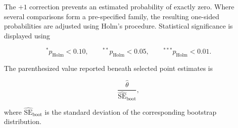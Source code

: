 The \(+1\) correction prevents an estimated probability of exactly zero.
Where several comparisons form a pre-specified family, the resulting
one-sided probabilities are adjusted using Holm's procedure. Statistical
significance is displayed using

\[
{}^{*}p_{\mathrm{Holm}}<0.10,
\qquad
{}^{**}p_{\mathrm{Holm}}<0.05,
\qquad
{}^{***}p_{\mathrm{Holm}}<0.01.
\]

The parenthesized value reported beneath selected point estimates is

\[
\frac{
\widehat{\theta}
}{
\widehat{\mathrm{SE}}_{\mathrm{boot}}
},
\]

where \(\widehat{\mathrm{SE}}_{\mathrm{boot}}\) is the standard deviation of the corresponding bootstrap distribution.





